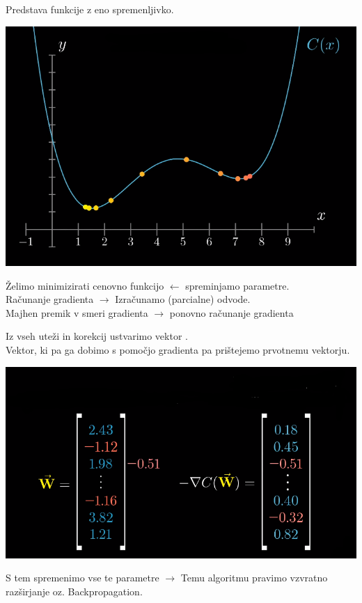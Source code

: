 \documentclass{beamer}
\begin{document}
\begin{frame}{}
Predstava funkcije z eno spremenljivko.\\
\smallskip
\begin{center}
\includegraphics[scale = 0.3]{photo/2foto1} \\
\end{center}

Želimo minimizirati cenovno funkcijo $\leftarrow$ spreminjamo parametre. \\

Računanje gradienta $\rightarrow$ Izračunamo (parcialne) odvode. \\
Majhen premik v smeri gradienta $\rightarrow$ ponovno računanje gradienta
\end{frame}

\begin{frame}{}
Iz vseh uteži in korekcij ustvarimo vektor .\\
\smallskip
Vektor, ki pa ga dobimo s pomočjo gradienta pa prištejemo prvotnemu vektorju. \\

\begin{center}
\includegraphics[scale = 0.35]{photo/2foto4} \\
\end{center}

S tem spremenimo vse te parametre $\rightarrow$ Temu algoritmu pravimo vzvratno razširjanje oz. Backpropagation.
\end{frame}
\end{document}
